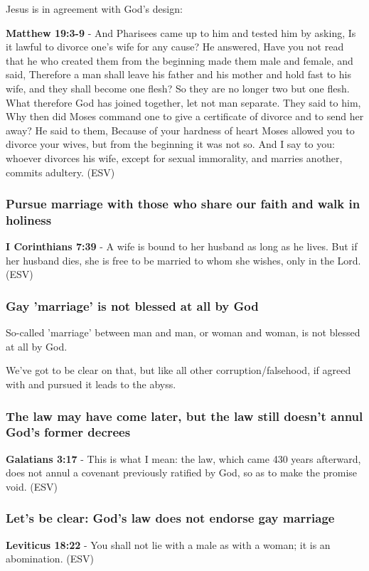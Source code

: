 \documentclass[11pt]{article}
\begin{document}
Jesus is in agreement with God's design:

\textbf{Matthew 19:3-9} - And Pharisees came up to him and tested him by asking, Is it lawful to divorce one's wife for any cause? He answered, Have you not read that he who created them from the beginning made them male and female, and said, Therefore a man shall leave his father and his mother and hold fast to his wife, and they shall become one flesh? So they are no longer two but one flesh. What therefore God has joined together, let not man separate. They said to him, Why then did Moses command one to give a certificate of divorce and to send her away? He said to them, Because of your hardness of heart Moses allowed you to divorce your wives, but from the beginning it was not so. And I say to you: whoever divorces his wife, except for sexual immorality, and marries another, commits adultery. (ESV)

\subsubsection{Pursue marriage with those who share our faith and walk in holiness}
\label{sec:org2ac619b}
\textbf{I Corinthians 7:39} - A wife is bound to her husband as long as he lives. But if her husband dies, she is free to be married to whom she wishes, only in the Lord. (ESV)

\subsubsection{Gay 'marriage' is not blessed at all by God}
\label{sec:org5008b45}
So-called 'marriage' between man and man, or woman and woman, is not blessed at all by God.

We've got to be clear on that, but like all other corruption/falsehood, if agreed with and pursued it leads to the abyss.

\subsubsection{The law may have come later, but the law still doesn't annul God's former decrees}
\label{sec:orge19f1a1}
\textbf{Galatians 3:17} - This is what I mean: the law, which came 430 years afterward, does not annul a covenant previously ratified by God, so as to make the promise void. (ESV)

\subsubsection{Let's be clear: God's law does not endorse gay marriage}
\label{sec:orgd610adf}
\textbf{Leviticus 18:22} - You shall not lie with a male as with a woman; it is an abomination. (ESV)
\end{document}
